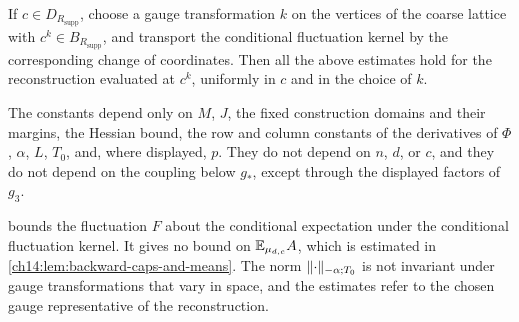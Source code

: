 \begin{theorem}
If $c\in D_{R_{\mathrm{supp}}}$, choose a gauge transformation $k$ on the vertices of the coarse lattice with $c^k\in B_{R_{\mathrm{supp}}}$, and transport the conditional fluctuation kernel by the corresponding change of coordinates. Then all the above estimates hold for the reconstruction evaluated at $c^k$, uniformly in $c$ and in the choice of $k$.

The constants depend only on $M$, $J$, the fixed construction domains and their margins, the Hessian bound, the row and column constants of the derivatives of $\Phi$, $\alpha$, $L$, $T_0$, and, where displayed, $p$. They do not depend on $n$, $d$, or $c$, and they do not depend on the coupling below $g_*$, except through the displayed factors of $g_3$.
\end{theorem}

\begin{remark}\label{ch13:rem:scope}
 bounds the fluctuation $F$ about the conditional expectation under the conditional fluctuation kernel. It gives no bound on $\mathbb E_{\mu_{d,c}}A$, which is estimated in \cref{ch14:lem:backward-caps-and-means}. The norm $\lVert \cdot\rVert_{-\alpha;T_0}$ is not invariant under gauge transformations that vary in space, and the estimates refer to the chosen gauge representative of the reconstruction.
\end{remark}

